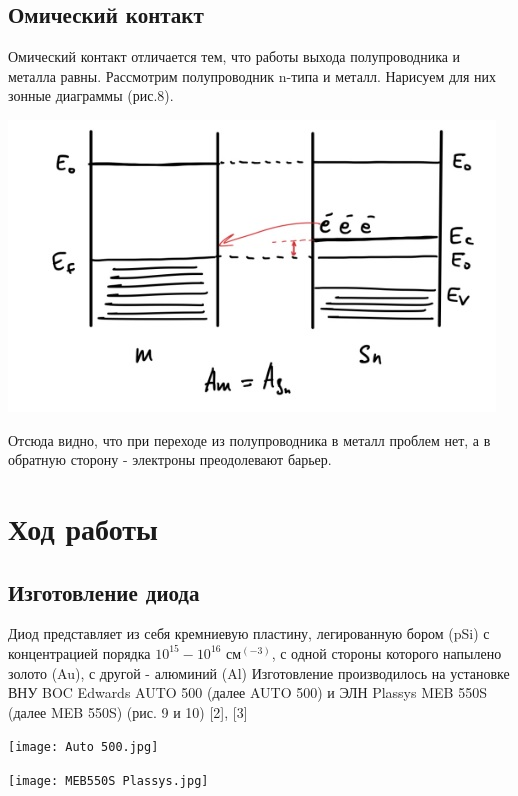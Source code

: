 \documentclass[a4paper]{article}
\begin{document}
\subsection*{Омический контакт}
Омический контакт отличается тем, что работы выхода полупроводника и металла равны. Рассмотрим полупроводник n-типа и металл. Нарисуем для них зонные диаграммы (рис.8).
\begin{center}
    \includegraphics[scale = 0.7]{om_contact.jpg}
\end{center}
Отсюда видно, что при переходе из полупроводника в металл проблем нет, а в обратную сторону - электроны преодолевают барьер.

\section{Ход работы}
\subsection{Изготовление диода}

Диод представляет из себя кремниевую пластину, легированную бором (pSi) с концентрацией порядка $10^{15}-10^{16}$ см$^{(-3)}$, с одной стороны которого напылено золото (Au), с другой - алюминий (Al)
Изготовление производилось на установке ВНУ BOC Edwards AUTO 500 (далее AUTO 500) и ЭЛН Plassys MEB 550S (далее MEB 550S) (рис. 9 и 10) [2], [3] \\
\begin{center}
    \texttt{[image: Auto 500.jpg]}
\end{center}
\begin{center}
    \texttt{[image: MEB550S Plassys.jpg]}
\end{center}
\end{document}
